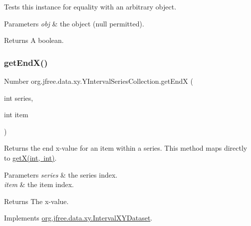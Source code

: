 Tests this instance for equality with an arbitrary object.


\begin{DoxyParams}{Parameters}
{\em obj} & the object ({\ttfamily null} permitted).\\
\hline
\end{DoxyParams}
\begin{DoxyReturn}{Returns}
A boolean. 
\end{DoxyReturn}
\mbox{\label{classorg_1_1jfree_1_1data_1_1xy_1_1_y_interval_series_collection_a5eed5a5a74285ab346d7bf3e19d31d58}} 
\subsubsection{\texorpdfstring{get\+End\+X()}{getEndX()}}
{\footnotesize\ttfamily Number org.\+jfree.\+data.\+xy.\+Y\+Interval\+Series\+Collection.\+get\+EndX (\begin{DoxyParamCaption}\item[{int}]{series,  }\item[{int}]{item }\end{DoxyParamCaption})}

Returns the end x-\/value for an item within a series. This method maps directly to \mbox{\hyperlink{classorg_1_1jfree_1_1data_1_1xy_1_1_y_interval_series_collection_aea821e6f7de4ea55e3ebf533ae124c10}{get\+X(int, int)}}.


\begin{DoxyParams}{Parameters}
{\em series} & the series index. \\
\hline
{\em item} & the item index.\\
\hline
\end{DoxyParams}
\begin{DoxyReturn}{Returns}
The x-\/value. 
\end{DoxyReturn}


Implements \mbox{\hyperlink{interfaceorg_1_1jfree_1_1data_1_1xy_1_1_interval_x_y_dataset_a93161a6d6c1db37cfac030239c62ab0a}{org.\+jfree.\+data.\+xy.\+Interval\+X\+Y\+Dataset}}.

\mbox{\label{classorg_1_1jfree_1_1data_1_1xy_1_1_y_interval_series_collection_a93694e5bea9406c2ac871815d6a3c038}} 
